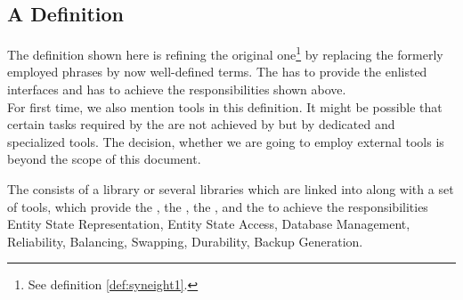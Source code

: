 \documentclass[a4paper, 12pt]{book}
\begin{document}
\subsection{A Definition}
\label{sec:a-definition}

The definition shown here is refining the original one\footnote{See definition
  \vref{def:syneight1}.} by replacing the formerly employed phrases by now
well-defined terms. The \SYNEIGHT has to provide
the enlisted interfaces and has to achieve the responsibilities shown above.\\
For first time, we also mention tools in this definition. It might be possible
that certain tasks required by the \SYNEIGHT are not achieved by
 but by dedicated and specialized tools. The
decision, whether we are going to employ external tools is beyond the scope of
this document.

\begin{definition*}{\SYNEIGHT}
  \label{def:syneight2}
  The \SYNEIGHT consists of a library or several libraries which are
  linked into  along with a set of tools, which
  provide the 
  , the
  , the
  , and the
  to achieve the responsibilities 
  Entity State Representation,
  Entity State Access,
  Database Management,
  Reliability,
  Balancing,                   
  Swapping,                    
  Durability,                  
  Backup Generation.
\end{definition*}
\end{document}
